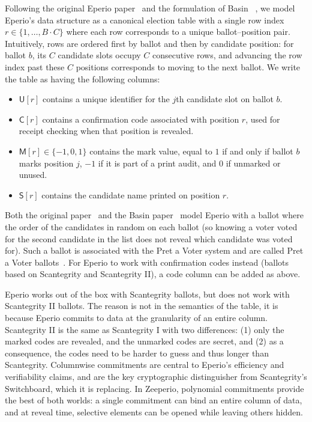Following the original Eperio paper~\cite{ECHA10} and the formulation of Basin \etal~\cite{BDGR21}, we model Eperio’s data structure as a canonical election table with a single row index $r \in \{1,\dots,B\cdot C\}$ where each row corresponds to a unique ballot–position pair. Intuitively, rows are ordered first by ballot and then by candidate position: for ballot $b$, its $C$ candidate slots occupy $C$ consecutive rows, and advancing the row index past these $C$ positions corresponds to moving to the next ballot. We write the table as having the following columns:

\begin{itemize}
\item $\mathsf{U}[r]$ contains a unique identifier for the $j$th candidate slot on ballot $b$.

\item $\mathsf{C}[r]$ contains a confirmation code associated with position $r$, used for receipt checking when that position is revealed.

\item $\mathsf{M}[r] \in \{-1,0,1\}$ contains the mark value, equal to $1$ if and only if ballot $b$ marks position $j$, $-1$ if it is part of a print audit, and $0$ if unmarked or unused.

\item $\mathsf{S}[r]$ contains the candidate name printed on position $r$.

\end{itemize}

Both the original paper~\cite{ECHA10} and the Basin \etal paper~\cite{BDGR21} model Eperio with a ballot where the order of the candidates in random on each ballot (so knowing a voter voted for the second candidate in the list does not reveal which candidate was voted for). Such a ballot is associated with the Pret a Voter system and are called Pret a Voter ballots~\cite{RBH+09}. For Eperio to work with confirmation codes instead (ballots based on Scantegrity and Scantegrity II), a code column can be added as above. 

Eperio works out of the box with Scantegrity ballots, but does not work with Scantegrity II ballots. The reason is not in the semantics of the table, it is because Eperio commits to data at the granularity of an entire column. Scantegrity II is the same as Scantegrity I with two differences: (1) only the marked codes are revealed, and the unmarked codes are secret, and (2) as a consequence, the codes need to be harder to guess and thus longer than Scantegrity. Columnwise commitments are central to Eperio's efficiency and verifiability claims, and are the key cryptographic distinguisher from Scantegrity's Switchboard, which it is replacing. In Zeeperio, polynomial commitments provide the best of both worlds: a single commitment can bind an entire column of data, and at reveal time, selective elements can be opened while leaving others hidden. 

